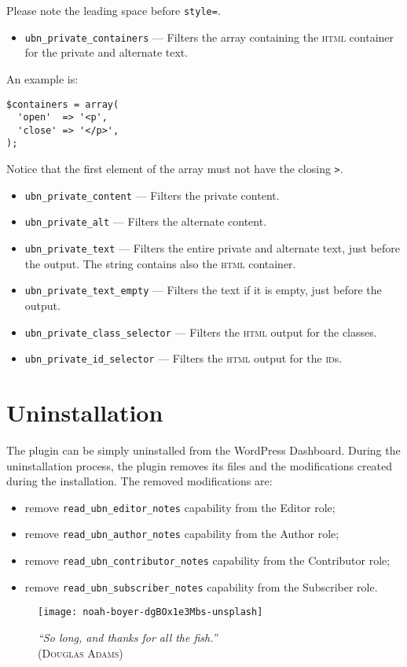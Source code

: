 Please note the leading space before \verb+style=+.

\begin{itemize}
 \item \verb+ubn_private_containers+ --- Filters the array containing the
 \textsc{html} container for the private and alternate text.
\end{itemize}

An example is:

\begin{lstlisting}
$containers = array(
  'open'  => '<p',
  'close' => '</p>',
);
\end{lstlisting}

Notice that the first element of the array must not have the closing \verb+>+.

\begin{itemize}
 \item \verb+ubn_private_content+ --- Filters the private content.
 \item \verb+ubn_private_alt+ --- Filters the alternate content.
 \item \verb+ubn_private_text+ --- Filters the entire private and alternate text,
 just before the output. The string contains also the \textsc{html} container.
 \item \verb+ubn_private_text_empty+ --- Filters the text if it is empty, just
 before the output.
 \item \verb+ubn_private_class_selector+ --- Filters the \textsc{html} output for
 the classes.
 \item \verb+ubn_private_id_selector+ --- Filters the \textsc{html} output for the
 \textsc{id}s.
\end{itemize}



\chapter{Uninstallation}

The plugin can be simply uninstalled from the WordPress Dashboard. During the
uninstallation process, the plugin removes its files and the modifications
created during the installation. The removed modifications are:

\begin{itemize}
  \item remove \texttt{read\_ubn\_editor\_notes} capability from the Editor role;
  \item remove \texttt{read\_ubn\_author\_notes} capability from the Author role;
  \item remove \texttt{read\_ubn\_contributor\_notes} capability from the Contributor role;
  \item remove \texttt{read\_ubn\_subscriber\_notes} capability from the Subscriber role.
\end{itemize}

\vfill

\begin{figure}[h]
	\centering
	\texttt{[image: noah-boyer-dgBOx1e3Mbs-unsplash]}
  \caption{\emph{``So long, and thanks for all the fish.''}\\(\textsc{Douglas Adams})}
	\label{fig:dolphin}
\end{figure}

